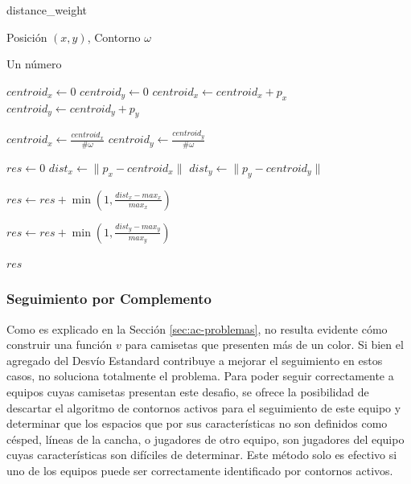 \begin{algorithm}
    \caption{distance\_weight}
    \label{alg:distance-weight}
    \begin{algorithmic}
    \Require\hspace{\algorithmicindent}\hspace{\algorithmicindent}Posición $(x, y)$, Contorno $\omega$

    \Ensure\hspace{\algorithmicindent}\hspace{0.23cm} Un número
    \State

    \State $centroid_x \gets 0$
    \State $centroid_y \gets 0$
        \State $centroid_x \gets centroid_x + p_x$
        \State $centroid_y \gets centroid_y + p_y$
    \EndFor

    \State $centroid_x \gets \frac{centroid_x}{\#\omega}$
    \State $centroid_y \gets \frac{centroid_y}{\#\omega}$


    \State $res \gets 0$
    \State $dist_x \gets \|p_x - centroid_x\|$
    \State $dist_y \gets \|p_y - centroid_y\|$

        \State $res \gets res + \min(1, \frac{dist_x - max_x}{max_x})$
    \EndIf

        \State $res \gets res + \min(1, \frac{dist_y - max_y}{max_y})$
    \EndIf

    \State \Return $res$
    \end{algorithmic}
\end{algorithm}

\subsubsection{Seguimiento por Complemento}

Como es explicado en la Sección \ref{sec:ac-problemas}, no resulta evidente
cómo construir una función $v$ para camisetas que presenten más de un color. Si
bien el agregado del Desvío Estandard contribuye a mejorar el seguimiento en %
estos casos, no soluciona totalmente el problema. Para poder seguir
correctamente a equipos cuyas camisetas presentan este desafio, se ofrece la
posibilidad de descartar el algoritmo de contornos activos para el seguimiento
de este equipo y determinar que los espacios que por sus características no son
definidos como césped, líneas de la cancha, o jugadores de otro equipo, son
jugadores del equipo cuyas características son difíciles de determinar. Este
método solo es efectivo si uno de los equipos puede ser correctamente
identificado por contornos activos.

